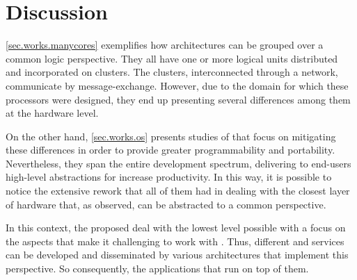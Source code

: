 \section{Discussion}

	\autoref{sec.works.manycores} exemplifies how \manycore architectures can be
	grouped over a common logic perspective.
	They all have one or more logical units distributed and incorporated on clusters.
	The clusters, interconnected through a network, communicate by message-exchange.
	However, due to the domain for which these processors were designed, they end up
	presenting several differences among them at the hardware level.

	On the other hand, \autoref{sec.works.os} presents studies of \oss that focus on
	mitigating these differences in order to provide greater programmability and portability.
	Nevertheless, they span the entire development spectrum, delivering to end-users
	high-level abstractions for increase productivity.
	In this way, it is possible to notice the extensive rework that all of them had in
	dealing with the closest layer of hardware that, as observed, can be abstracted to
	a common perspective.

	In this context, the proposed \hal deal with the lowest level possible with a focus
	on the aspects that make it challenging to work with \manycores.
	Thus, different \oss and services can be developed and disseminated by various
	architectures that implement this perspective.
	So consequently, the applications that run on top of them.